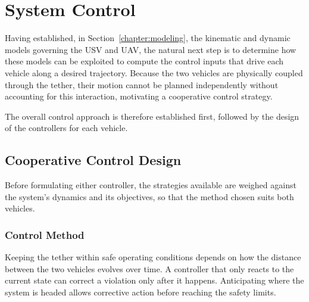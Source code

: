 
\chapter{System Control}
\label{chapter:control}

Having established, in Section~\ref{chapter:modeling}, the kinematic and dynamic models governing the USV and UAV, the natural next step is to determine how these models can be exploited to compute the control inputs that drive each vehicle along a desired trajectory. Because the two vehicles are physically coupled through the tether, their motion cannot be planned independently without accounting for this interaction, motivating a cooperative control strategy.

The overall control approach is therefore established first, followed by the design of the controllers for each vehicle.

\section{Cooperative Control Design}
\label{sec:ctrl_architecture}
Before formulating either controller, the strategies available are weighed against the system's dynamics and its objectives, so that the method chosen suits both vehicles.

\subsection{Control Method}
\label{sec:ctrl_method}

Keeping the tether within safe operating conditions depends on how the distance between the two vehicles evolves over time. A controller that only reacts to the current state can correct a violation only after it happens. Anticipating where the system is headed allows corrective action before reaching the safety limits.

